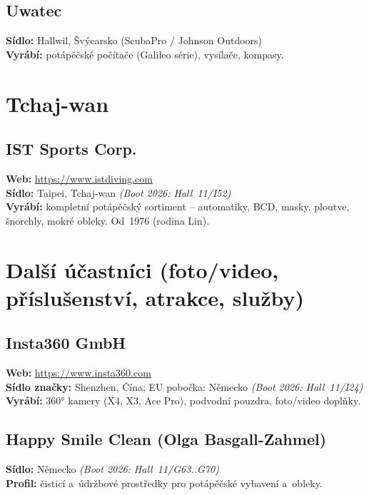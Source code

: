 \documentclass[11pt,a4paper]{article}
\begin{document}
\subsection{Uwatec}
\textbf{Sídlo:} Hallwil, Švýcarsko (ScubaPro / Johnson Outdoors) \\
\textbf{Vyrábí:} potápěčské počítače (Galileo série), vysílače, kompasy.

\section{Tchaj-wan}

\subsection{IST Sports Corp.}
\textbf{Web:} \url{https://www.istdiving.com} \\
\textbf{Sídlo:} Taipei, Tchaj-wan \quad\emph{(Boot 2026: Hall~11/I52)} \\
\textbf{Vyrábí:} kompletní potápěčský sortiment -- automatiky, BCD, masky, ploutve, šnorchly, mokré obleky. Od~1976 (rodina Lin).

\section{Další účastníci (foto/video, příslušenství, atrakce, služby)}

\subsection{Insta360 GmbH}
\textbf{Web:} \url{https://www.insta360.com} \\
\textbf{Sídlo značky:} Shenzhen, Čína; EU pobočka: Německo \quad\emph{(Boot 2026: Hall~11/I24)} \\
\textbf{Vyrábí:} 360° kamery (X4, X3, Ace Pro), podvodní pouzdra, foto/video doplňky.

\subsection{Happy Smile Clean (Olga Basgall-Zahmel)}
\textbf{Sídlo:} Německo \quad\emph{(Boot 2026: Hall~11/G63..G70)} \\
\textbf{Profil:} čisticí a~údržbové prostředky pro potápěčské vybavení a~obleky.
\end{document}
